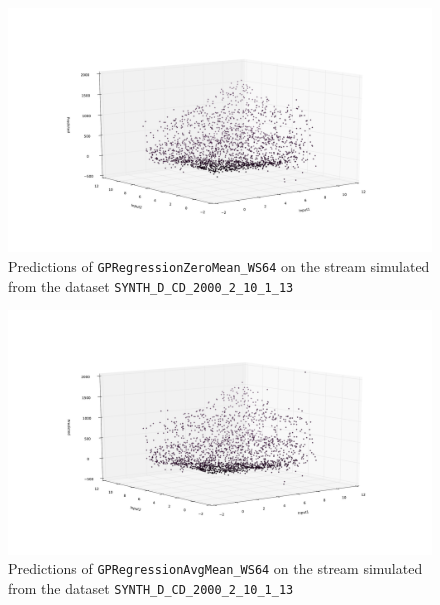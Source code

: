 \begin{figure}[htbp]
  \centering
    \includegraphics[width=\linewidth]{./Figures/gpreg_zeromean_ws64_approximated_func_SYNTH_D_CD_2000_2_10_1_13.pdf}
  \caption{Predictions of \texttt{GPRegressionZeroMean\_WS64} on the stream simulated from the dataset \texttt{SYNTH\_D\_CD\_2000\_2\_10\_1\_13}}
  \label{fig:gpreg_zeromean_ws64_approximated_func_SYNTH_D_CD_2000_2_10_1_13}
\end{figure}

\begin{figure}[htbp]
  \centering
    \includegraphics[width=\linewidth]{./Figures/gpreg_avgmean_ws64_approximated_func_SYNTH_D_CD_2000_2_10_1_13.pdf}
  \caption{Predictions of \texttt{GPRegressionAvgMean\_WS64} on the stream simulated from the dataset \texttt{SYNTH\_D\_CD\_2000\_2\_10\_1\_13}}
  \label{fig:gpreg_avgmean_ws64_approximated_func_SYNTH_D_CD_2000_2_10_1_13}
\end{figure}

